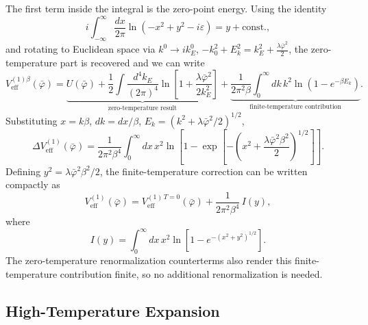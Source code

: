 The first term inside the integral is the zero-point energy. Using the
identity
\begin{equation}
	i\int_{-\infty}^{\infty}\frac{dx}{2\pi}
	\ln(-x^2+y^2-i\varepsilon) = y + \text{const.},
\end{equation}
and rotating to Euclidean space via $k^0\to ik^0_E$, $-k_0^2+E_k^2
	= k_E^2 + \frac{\lambda\bar\varphi^2}{2}$, the zero-temperature part
is recovered and we can write
\begin{equation}
	V_{\text{eff}}^{(1)\beta}(\bar\varphi)
	= \underbrace{U(\bar\varphi) + \frac{1}{2}
		\int\frac{d^4k_E}{(2\pi)^4}
		\ln\!\left[1+\frac{\lambda\bar\varphi^2}{2k_E^2}\right]}_{
		\text{zero-temperature result}}
	+ \underbrace{\frac{1}{2\pi^2\beta}
		\int_0^{\infty}dk\,k^2
		\ln\!\left(1-e^{-\beta E_k}\right)}_{
		\text{finite-temperature contribution}}.
\end{equation}
Substituting $x = k\beta$, $dk = dx/\beta$, $E_k =
		(k^2+\lambda\bar\varphi^2/2)^{1/2}$,
\begin{equation}
	\Delta V_{\text{eff}}^{(1)}(\bar\varphi)
	= \frac{1}{2\pi^2\beta^4}\int_0^{\infty}dx\,x^2
	\ln\!\left[1-\exp\!\left[{-\left(x^2
				+\frac{\lambda\bar\varphi^2\beta^2}{2}\right)^{1/2}}\right]\right].
\end{equation}
Defining $y^2 = \lambda\bar\varphi^2\beta^2/2$, the finite-temperature
correction can be written compactly as
\begin{equation}
	V_{\text{eff}}^{(1)}(\bar\varphi)
	= V_{\text{eff}}^{(1)\,T=0}(\bar\varphi)
	+ \frac{1}{2\pi^2\beta^4}\,I(y),
\end{equation}
where
\begin{equation}
	I(y) = \int_0^{\infty}dx\,x^2
	\ln\!\left[1-e^{-(x^2+y^2)^{1/2}}\right].
\end{equation}
The zero-temperature renormalization counterterms also render this
finite-temperature contribution finite, so no additional renormalization
is needed.

\subsection*{High-Temperature Expansion}

